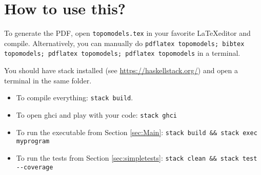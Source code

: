 
\section{How to use this?}

To generate the PDF, open \texttt{topomodels.tex} in your favorite \LaTeX editor and compile.
Alternatively, you can manually do
\texttt{pdflatex topomodels; bibtex topomodels; pdflatex topomodels; pdflatex topomodels} in a terminal.

You should have stack installed (see \url{https://haskellstack.org/}) and
open a terminal in the same folder.

\begin{itemize}
  \item To compile everything: \verb|stack build|.
  \item To open ghci and play with your code: \verb|stack ghci|
  \item To run the executable from Section \ref{sec:Main}: \verb|stack build && stack exec myprogram|
  \item To run the tests from Section \ref{sec:simpletests}: \verb|stack clean && stack test --coverage|
\end{itemize}
